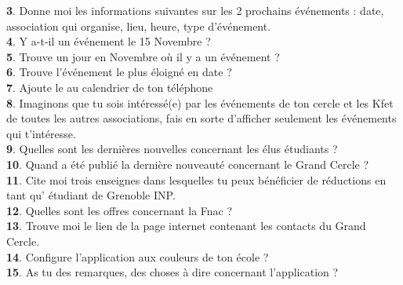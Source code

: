 \documentclass[a4paper, 11pt]{article}
\begin{document}
\textbf{3}. Donne moi les informations suivantes sur les 2 prochains événements : date, association qui organise, lieu, heure, type d’événement.
  \\

\textbf{4}. Y a-t-il un événement le 15 Novembre ?
  \\

\textbf{5}. Trouve un jour en Novembre où il y a un événement ?	
  \\

\textbf{6}. Trouve l’événement le plus éloigné en date ?	
  \\

\textbf{7}. Ajoute le au calendrier de ton téléphone	
\\

\textbf{8}. Imaginons que tu sois intéressé(e) par les événements de ton cercle et les Kfet de toutes les autres associations, fais en sorte d’afficher seulement les événements qui t’intéresse.
\\

\textbf{9}. Quelles sont les dernières nouvelles concernant les élus étudiants ?	
  \\

\textbf{10}.  Quand a été publié la dernière nouveauté concernant le Grand Cercle ?	
\\

\textbf{11}.  Cite moi trois enseignes dans lesquelles tu peux bénéficier de réductions en tant qu' étudiant de Grenoble INP.
  \\

\textbf{12}. Quelles sont les offres concernant la Fnac ?	
\\

\textbf{13}.  Trouve moi le lien de la page internet contenant les contacts du Grand Cercle.	
  \\

\textbf{14}.  Configure l’application aux couleurs de ton école ?	
\\

\textbf{15}. As tu des remarques, des choses à dire concernant l’application ?	
  
\end{document}
